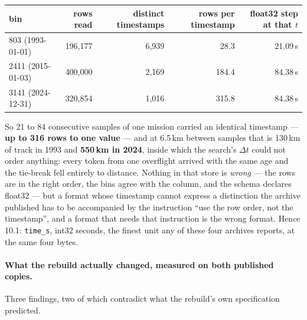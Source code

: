 \documentclass[10pt]{article}
\newcommand{\code}[1]{\texttt{#1}}
\begin{document}
\begin{center}\footnotesize
\begin{tabular}{@{}lrrrr@{}}
\toprule
bin & rows read & distinct timestamps & rows per timestamp & float32 step at that $t$ \\
\midrule
803 (1993-01-01)  & 196,177 & 6,939 & 28.3  & 21.09\,s \\
2411 (2015-01-03) & 400,000 & 2,169 & 184.4 & 84.38\,s \\
3141 (2024-12-31) & 320,854 & 1,016 & 315.8 & 84.38\,s \\
\bottomrule
\end{tabular}
\end{center}

So 21 to 84 consecutive samples of one mission carried an identical timestamp
--- \textbf{up to 316 rows to one value} --- and at 6.5\,km between samples that
is 130\,km of track in 1993 and \textbf{550\,km in 2024}, inside which the
search's $\Delta t$ could not order anything: every token from one overflight
arrived with the same age and the tie-break fell entirely to distance. Nothing
in that store is \emph{wrong} --- the rows are in the right order, the bins
agree with the column, and the schema declares float32 --- but a format whose
timestamp cannot express a distinction the archive published has to be
accompanied by the instruction ``use the row order, not the timestamp'', and a
format that needs that instruction is the wrong format. Hence 10.1:
\code{time\_s}, int32 seconds, the finest unit any of these four archives
reports, at the same four bytes.

\paragraph{What the rebuild actually changed, measured on both published
copies.} Three findings, two of which contradict what the rebuild's own
specification predicted.
\end{document}
